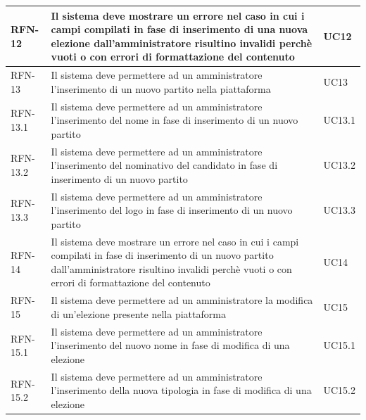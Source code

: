 \begin{longtable}{| p{} | p{} | p{} |}
RFN-12     & Il sistema deve mostrare un errore nel caso in cui i campi compilati in fase di inserimento di una nuova elezione dall'amministratore risultino invalidi perchè vuoti o con errori di formattazione del contenuto  & UC12 \\

\hline

RFN-13     & Il sistema deve permettere ad un amministratore l'inserimento di un nuovo partito nella piattaforma  & UC13 \\

\hline

RFN-13.1     & Il sistema deve permettere ad un amministratore l'inserimento del nome in fase di inserimento di un nuovo partito  & UC13.1 \\

\hline

RFN-13.2     & Il sistema deve permettere ad un amministratore l'inserimento del nominativo del candidato in fase di inserimento di un nuovo partito  & UC13.2 \\

\hline

RFN-13.3     & Il sistema deve permettere ad un amministratore l'inserimento del logo in fase di inserimento di un nuovo partito  & UC13.3 \\

\hline

RFN-14     & Il sistema deve mostrare un errore nel caso in cui i campi compilati in fase di inserimento di un nuovo partito dall'amministratore risultino invalidi perchè vuoti o con errori di formattazione del contenuto  & UC14 \\

\hline

RFN-15     & Il sistema deve permettere ad un amministratore la modifica di un'elezione presente nella piattaforma  & UC15 \\

\hline

RFN-15.1     & Il sistema deve permettere ad un amministratore l'inserimento del nuovo nome in fase di modifica di una elezione  & UC15.1 \\

\hline

RFN-15.2     & Il sistema deve permettere ad un amministratore l'inserimento della nuova tipologia in fase di modifica di una elezione  & UC15.2 \\

\hline


\end{longtable}
